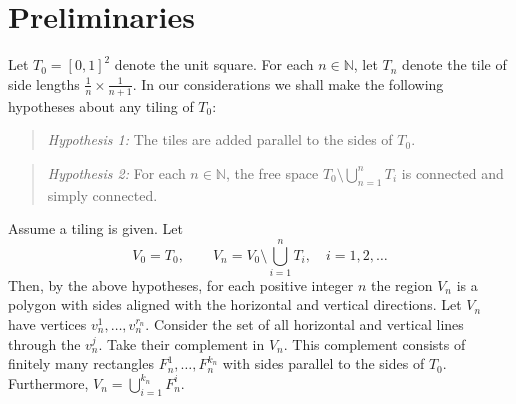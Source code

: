 \documentclass[11pt]{article}
\theoremstyle{plain}%
\theoremstyle{definition}
\theoremstyle{remark}
\numberwithin{equation}{section}
\begin{document}
\section{Preliminaries}
Let $T_0=[0,1]^2$ denote the unit square.
For each $n\in\mathbb{N}$, let $T_n$ denote the tile of side lengths $\frac{1}{n}\times\frac{1}{n+1}$.
In our considerations we shall make the following hypotheses about any tiling of $T_0$:
\begin{quote}
{\it Hypothesis 1:} 
The tiles are added parallel to the sides of $T_0$.
\end{quote}
\begin{quote}
{\it Hypothesis 2:}
For each $n\in\mathbb{N}$, the free space $T_0\setminus \bigcup_{n=1}^{n}T_i$ is connected and simply connected.
\end{quote}
Assume a tiling is given.
Let 
\begin{equation}
V_0=T_0, \qquad V_n=V_0\setminus \bigcup_{i=1}^{n}T_i, \quad i=1,2,\ldots
\end{equation}
Then, by the above hypotheses, for each positive integer $n$ the region $V_n$ is a polygon with sides aligned with the horizontal and vertical directions.
Let $V_n$ have vertices $v_n^1,\ldots,v_n^{r_n}$.
Consider the set of all horizontal and vertical lines through the $v_n^j$.
Take their complement in $V_n$.
This complement consists of finitely many rectangles $F_n^1,\ldots,F_n^{k_n}$ with sides parallel to the sides of $T_0$.
Furthermore, $V_n=\bigcup_{i=1}^{k_n} F_n^i$.
\end{document}
